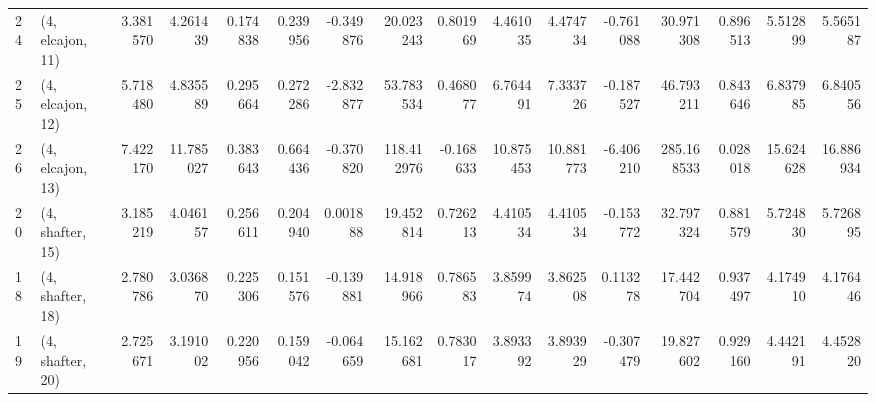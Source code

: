 \begin{tabular}{llrrrrrrrrrrrrrr}
24 &  (4, elcajon, 11) &  3.381570 &   4.261439 &   0.174838 &  0.239956 & -0.349876 &   20.023243 &  0.801969 &   4.461035 &   4.474734 & -0.761088 &   30.971308 &  0.896513 &   5.512899 &   5.565187 \\
25 &  (4, elcajon, 12) &  5.718480 &   4.835589 &   0.295664 &  0.272286 & -2.832877 &   53.783534 &  0.468077 &   6.764491 &   7.333726 & -0.187527 &   46.793211 &  0.843646 &   6.837985 &   6.840556 \\
26 &  (4, elcajon, 13) &  7.422170 &  11.785027 &   0.383643 &  0.664436 & -0.370820 &  118.412976 & -0.168633 &  10.875453 &  10.881773 & -6.406210 &  285.168533 &  0.028018 &  15.624628 &  16.886934 \\
20 &  (4, shafter, 15) &  3.185219 &   4.046157 &   0.256611 &  0.204940 &  0.001888 &   19.452814 &  0.726213 &   4.410534 &   4.410534 & -0.153772 &   32.797324 &  0.881579 &   5.724830 &   5.726895 \\
18 &  (4, shafter, 18) &  2.780786 &   3.036870 &   0.225306 &  0.151576 & -0.139881 &   14.918966 &  0.786583 &   3.859974 &   3.862508 &  0.113278 &   17.442704 &  0.937497 &   4.174910 &   4.176446 \\
19 &  (4, shafter, 20) &  2.725671 &   3.191002 &   0.220956 &  0.159042 & -0.064659 &   15.162681 &  0.783017 &   3.893392 &   3.893929 & -0.307479 &   19.827602 &  0.929160 &   4.442191 &   4.452820 \\
\bottomrule
\end{tabular}
